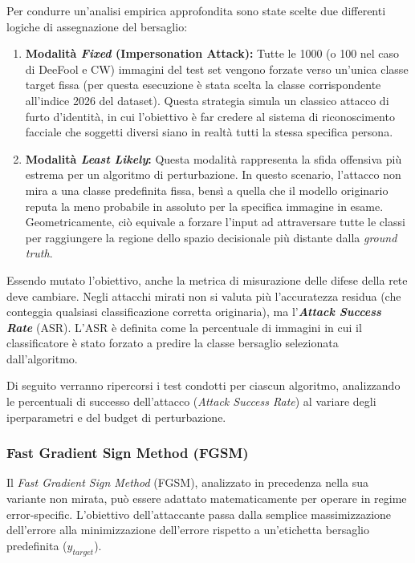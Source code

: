 \documentclass[a4paper, 12pt]{article}
\begin{document}
Per condurre un'analisi empirica approfondita sono state scelte due differenti logiche di assegnazione del bersaglio:
\begin{enumerate}
    \item \textbf{Modalità \textit{Fixed} (Impersonation Attack):} Tutte le 1000 (o 100 nel caso di DeeFool e CW) immagini del test set vengono forzate verso un'unica classe target fissa (per questa esecuzione è stata scelta la classe corrispondente all'indice 2026 del dataset). Questa strategia simula un classico attacco di furto d'identità, in cui l'obiettivo è far credere al sistema di riconoscimento facciale che soggetti diversi siano in realtà tutti la stessa specifica persona.
    \item \textbf{Modalità \textit{Least Likely}:} Questa modalità rappresenta la sfida offensiva più estrema per un algoritmo di perturbazione. In questo scenario, l'attacco non mira a una classe predefinita fissa, bensì a quella che il modello originario reputa la meno probabile in assoluto per la specifica immagine in esame. Geometricamente, ciò equivale a forzare l'input ad attraversare tutte le classi per raggiungere la regione dello spazio decisionale più distante dalla \textit{ground truth}.

\end{enumerate}

Essendo mutato l'obiettivo, anche la metrica di misurazione delle difese della rete deve cambiare. Negli attacchi mirati non si valuta più l'accuratezza residua (che conteggia qualsiasi classificazione corretta originaria), ma l'\textit{\textbf{Attack Success Rate}} (ASR). L'ASR è definita come la percentuale di immagini in cui il classificatore è stato forzato a predire la classe bersaglio selezionata dall'algoritmo.

Di seguito verranno ripercorsi i test condotti per ciascun algoritmo, analizzando le percentuali di successo dell'attacco (\textit{Attack Success Rate}) al variare degli iperparametri e del budget di perturbazione.

\vspace{10pt}

\subsubsection{Fast Gradient Sign Method (FGSM)}
Il \textit{Fast Gradient Sign Method} (FGSM), analizzato in precedenza nella sua variante non mirata, può essere adattato matematicamente per operare in regime error-specific. L'obiettivo dell'attaccante passa dalla semplice massimizzazione dell'errore alla minimizzazione dell'errore rispetto a un'etichetta bersaglio predefinita ($y_{target}$).
\end{document}
